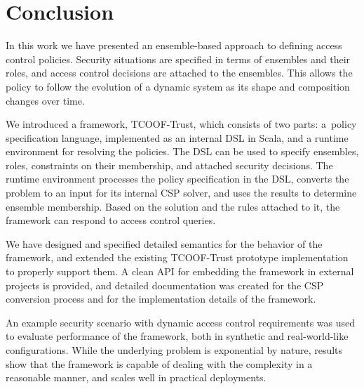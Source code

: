 \chapter{Conclusion}
\label{conclusion}

In this work we have presented an ensemble-based approach to defining access control
policies. Security situations are specified in terms of ensembles and their roles, and
access control decisions are attached to the ensembles. This allows the policy to follow
the evolution of a dynamic system as its shape and composition changes over time.

We introduced a framework, TCOOF-Trust, which consists of two parts: a~policy
specification language, implemented as an internal DSL in Scala, and a runtime
environment for resolving the policies. The DSL can be used to specify ensembles, roles,
constraints on their membership, and attached security decisions. The runtime
environment processes the policy specification in the DSL, converts the problem to an
input for its internal CSP solver, and uses the results to determine ensemble
membership. Based on the solution and the rules attached to it, the framework can
respond to access control queries.

We have designed and specified detailed semantics for the behavior of the framework, and
extended the existing TCOOF-Trust prototype implementation to properly support them. A
clean API for embedding the framework in external projects is provided, and detailed
documentation was created for the CSP conversion process and for the implementation
details of the framework.

An example security scenario with dynamic access control requirements was used to
evaluate performance of the framework, both in synthetic and real-world-like
configurations. While the underlying problem is exponential by nature, results show that
the framework is capable of dealing with the complexity in a reasonable manner, and
scales well in practical deployments.
